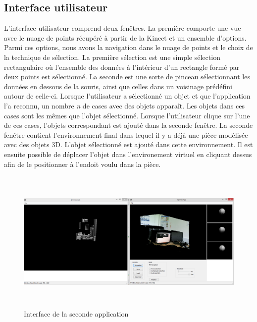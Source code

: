 \subsection{Interface utilisateur}
L'interface utilisateur comprend deux fenêtres. La première comporte une vue avec le nuage de points récupéré à partir de la Kinect
et un ensemble d'options. Parmi ces options, nous avons la navigation dans le nuage de points et le choix de la technique de 
sélection. La première sélection est une simple sélection rectangulaire où l'ensemble des données à l'intérieur d'un rectangle formé
par deux points est sélectionné. La seconde est une sorte de pinceau sélectionnant les données en dessous de la souris, ainsi que celles dans 
un voisinage prédéfini autour de celle-ci. Lorsque l'utilisateur a sélectionné un objet et que l'application l'a reconnu, un nombre \textit{n} de cases 
avec des objets apparaît. Les objets dans ces cases sont les mêmes que l'objet sélectionné. Lorsque l'utilisateur clique sur l'une 
de ces cases, l'objets correspondant est ajouté dans la seconde fenêtre.
La seconde fenêtre contient l'environnement final dans lequel il y a déjà une pièce modèlisée avec des objets 3D. L'objet sélectionné est ajouté dans cette environnement. Il est ensuite possible de déplacer l'objet dans l'environement virtuel en
cliquant dessus afin de le positionner à l'endoit voulu dans la pièce.

\begin{figure}[!h]
  \begin{center}
    \includegraphics[height=7cm]{image/appliObjet.PNG}
    \caption{Interface de la seconde application}
  \end{center}
\end{figure}

